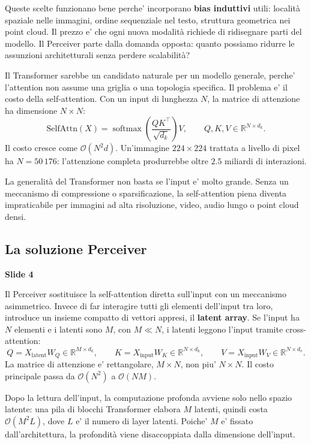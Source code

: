 \documentclass[11pt,a4paper]{article}
\newcommand{\R}{\mathbb{R}}
\newcommand{\bigO}{\mathcal{O}}
\newcommand{\softmax}{\operatorname{softmax}}
\newcommand{\slide}[1]{\textcolor{mainblue}{\textbf{Slide #1}}}
\begin{document}
Queste scelte funzionano bene perche' incorporano \textbf{bias induttivi}
utili: localit\`a spaziale nelle immagini, ordine sequenziale nel testo,
struttura geometrica nei point cloud. Il prezzo e' che ogni nuova modalit\`a
richiede di ridisegnare parti del modello. Il Perceiver parte dalla domanda
opposta: quanto possiamo ridurre le assunzioni architetturali senza perdere
scalabilit\`a?

Il Transformer sarebbe un candidato naturale per un modello generale, perche'
l'attention non assume una griglia o una topologia specifica. Il problema e'
il costo della self-attention. Con un input di lunghezza $N$, la matrice di
attenzione ha dimensione $N \times N$:
\[
  \text{SelfAttn}(X) = \softmax\!\left(\frac{QK^\top}{\sqrt{d_k}}\right)V,
  \qquad Q,K,V \in \R^{N \times d_k}.
\]
Il costo cresce come $\bigO(N^2 d)$. Un'immagine $224 \times 224$ trattata a
livello di pixel ha $N=50\,176$: l'attenzione completa produrrebbe oltre
$2.5$ miliardi di interazioni.

\begin{riskBox}[title={Il collo di bottiglia dei Transformer}]
La generalit\`a del Transformer non basta se l'input e' molto grande. Senza un
meccanismo di compressione o sparsificazione, la self-attention piena diventa
impraticabile per immagini ad alta risoluzione, video, audio lungo o point cloud
densi.
\end{riskBox}

\subsection{La soluzione Perceiver}
\slide{4}

Il Perceiver \cite{jaegle2021perceiver} sostituisce la self-attention diretta
sull'input con un meccanismo asimmetrico. Invece di far interagire tutti gli
elementi dell'input tra loro, introduce un insieme compatto di vettori appresi,
il \textbf{latent array}. Se l'input ha $N$ elementi e i latenti sono $M$, con
$M \ll N$, i latenti leggono l'input tramite cross-attention:
\[
  Q = X_{\text{latent}} W_Q \in \R^{M \times d_k}, \qquad
  K = X_{\text{input}} W_K \in \R^{N \times d_k}, \qquad
  V = X_{\text{input}} W_V \in \R^{N \times d_v}.
\]
La matrice di attenzione e' rettangolare, $M \times N$, non piu' $N \times N$.
Il costo principale passa da $\bigO(N^2)$ a $\bigO(NM)$.

Dopo la lettura dell'input, la computazione profonda avviene solo nello spazio
latente: una pila di blocchi Transformer elabora $M$ latenti, quindi costa
$\bigO(M^2 L)$, dove $L$ e' il numero di layer latenti. Poiche' $M$ e' fissato
dall'architettura, la profondit\`a viene disaccoppiata dalla dimensione
dell'input.
\end{document}
